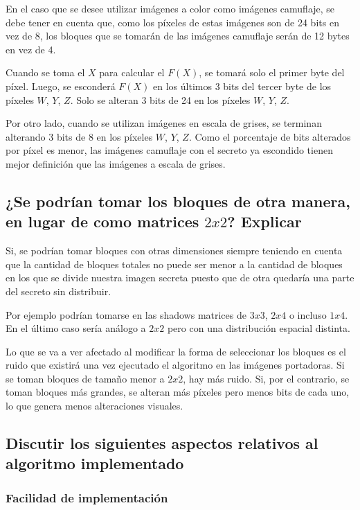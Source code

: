 \documentclass[11pt]{scrartcl} %
\begin{document}
En el caso que se desee utilizar imágenes a color como imágenes camuflaje, se debe tener en cuenta que, como los píxeles de estas imágenes son de 24 bits en vez de 8, los bloques que se tomarán de las imágenes camuflaje serán de 12 bytes en vez de 4.

Cuando se toma el $X$ para calcular el $F(X)$, se tomará solo el primer byte del píxel. Luego, se esconderá $F(X)$ en los últimos 3 bits del tercer byte de los píxeles $W$, $Y$, $Z$. Solo se alteran 3 bits de 24 en los píxeles $W$, $Y$, $Z$.

Por otro lado, cuando se utilizan imágenes en escala de grises, se terminan alterando 3 bits de 8 en los píxeles $W$, $Y$, $Z$. Como el porcentaje de bits alterados por píxel es menor, las imágenes camuflaje con el secreto ya escondido tienen mejor definición que las imágenes a escala de grises.

\subsection{¿Se podrían tomar los bloques de otra manera, en lugar de como matrices $2x2$? Explicar}

Si, se podrían tomar bloques con otras dimensiones siempre teniendo en cuenta que la cantidad de bloques totales no puede ser menor a la cantidad de bloques en los que se divide nuestra imagen secreta puesto que de otra quedaría una parte del secreto sin distribuir. 

Por ejemplo podrían tomarse en las shadows matrices de $3x3$, $2x4$ o incluso $1x4$. En el último caso sería análogo a $2x2$ pero con una distribución espacial distinta.

Lo que se va a ver afectado al modificar la forma de seleccionar los bloques es el ruido que existirá una vez ejecutado el algoritmo en las imágenes portadoras. Si se toman bloques de tamaño menor a $2x2$, hay más ruido. Si, por el contrario, se toman bloques más grandes, se alteran más píxeles pero menos bits de cada uno, lo que genera menos alteraciones visuales.

\subsection{Discutir los siguientes aspectos relativos al algoritmo implementado}
\subsubsection{Facilidad de implementación}
\end{document}
